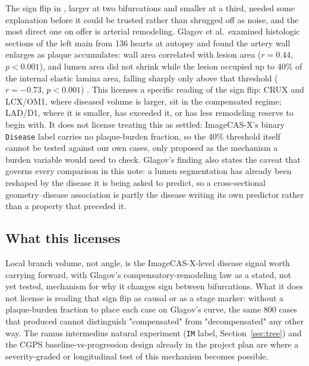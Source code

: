The sign flip in , larger at two bifurcations and smaller at a third, needed
some explanation before it could be trusted rather than shrugged off as noise, and the most direct
one on offer is arterial remodeling. Glagov et al.\ examined histologic sections of the left main
from 136 hearts at autopsy and found the artery wall enlarges as plaque accumulates: wall area
correlated with lesion area ($r = 0.44$, $p < 0.001$), and lumen area did not shrink while the
lesion occupied up to 40\% of the internal elastic lamina area, falling sharply only above that
threshold ($r = -0.73$, $p < 0.001$) \cite{glagov1987remodeling}. This licenses a specific reading
of the sign flip: CRUX and LCX/OM1, where diseased volume is larger, sit in the compensated regime;
LAD/D1, where it is smaller, has exceeded it, or has less remodeling reserve to begin with. It does
not license treating this as settled: ImageCAS-X's binary \texttt{Disease} label carries no
plaque-burden fraction, so the 40\% threshold itself cannot be tested against our own cases, only
proposed as the mechanism a burden variable would need to check. Glagov's finding also states the
caveat that governs every comparison in this note: a lumen segmentation has already been reshaped
by the disease it is being asked to predict, so a cross-sectional geometry--disease association is
partly the disease writing its own predictor rather than a property that preceded it.

\subsection*{What this licenses}

Local branch volume, not angle, is the ImageCAS-X-level disease signal worth carrying forward, with
Glagov's compensatory-remodeling law as a stated, not yet tested, mechanism for why it changes sign
between bifurcations. What it does not license is reading that sign flip as causal or as a stage
marker: without a plaque-burden fraction to place each case on Glagov's curve, the same 800 cases
that produced  cannot distinguish "compensated" from "decompensated" any
other way. The ramus intermedius natural experiment (\texttt{IM} label, Section~\ref{sec:tree}) and
the CGPS baseline-vs-progression design already in the project plan are where a severity-graded or
longitudinal test of this mechanism becomes possible.
